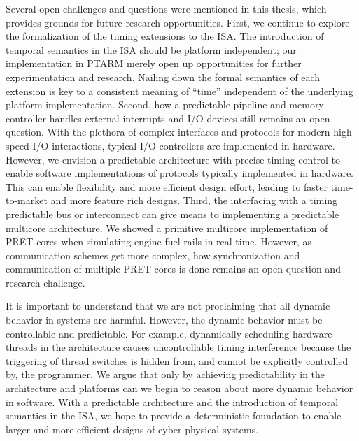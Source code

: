 Several open challenges and questions were mentioned in this thesis, which provides grounds for future research opportunities.  
First, we continue to explore the formalization of the timing extensions to the ISA. 
The introduction of temporal semantics in the ISA should be platform independent; our implementation in PTARM merely open up opportunities for further experimentation and research. 
Nailing down the formal semantics of each extension is key to a consistent meaning of ``time'' independent of the underlying platform implementation. 
Second, how a predictable pipeline and memory controller handles external interrupts and I/O devices still remains an open question.
With the plethora of complex interfaces and protocols for modern high speed I/O interactions, typical I/O controllers are implemented in hardware.
However, we envision a predictable architecture with precise timing control to enable software implementations of protocols typically implemented in hardware. 
This can enable flexibility and more efficient design effort, leading to faster time-to-market and more feature rich designs.        
Third, the interfacing with a timing predictable bus or interconnect can give means to implementing a predictable multicore architecture.
We showed a primitive multicore implementation of PRET cores when simulating engine fuel rails in real time.
However, as communication schemes get more complex, how synchronization and communication of multiple PRET cores is done remains an open question and research challenge. 

It is important to understand that we are not proclaiming that all dynamic behavior in systems are harmful.
However, the dynamic behavior must be controllable and predictable. 
For example, dynamically scheduling hardware threads in the architecture causes uncontrollable timing interference because the triggering of thread switches is hidden from, and cannot be explicitly controlled by, the programmer.
We argue that only by achieving predictability in the architecture and platforms can we begin to reason about more dynamic behavior in software.
With a predictable architecture and the introduction of temporal semantics in the ISA, we hope to provide a deterministic foundation to enable larger and more efficient designs of cyber-physical systems. 

